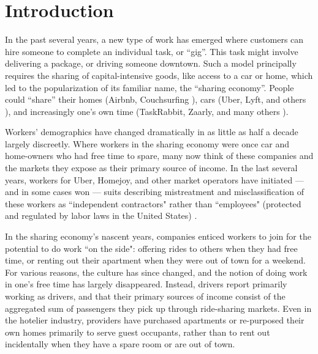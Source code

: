 \section{Introduction}



In the past several years, a new type of work has emerged where customers can hire someone to complete an individual task, or ``gig''.
This task might involve delivering a package, or driving someone downtown.
Such a model principally requires the sharing of capital-intensive goods, like access to a car or home,
which led to the popularization of its familiar name, the ``sharing economy''.
People could ``share'' their homes (Airbnb, Couchsurfing \cite{airbnbOfficial,couchsurfingOfficial}), cars (Uber, Lyft, and others \cite{uberOfficial,lyftOfficial}), and increasingly one's own time (TaskRabbit, Zaarly, and many others \cite{taskrabbitOfficial,zaarlyOfficial}).

Workers' demographics have changed dramatically in as little as half a decade largely discreetly.
Where workers in the sharing economy were once car and home-owners who had free time to spare,
many now think of these companies and the markets they expose as their primary source of income.
In the last several years, workers for Uber, Homejoy,
and other market operators have initiated
--- and in some cases won \cite{homejoySuit,uberSuit} ---
suits describing mistreatment and misclassification of these workers as
``independent contractors" rather than ``employees" (protected and regulated by labor laws in the United States) \cite{fedsUber}.

In the sharing economy's nascent years, companies enticed workers to join for the potential to do work ``on the side": offering rides to others when they had free time, or renting out their apartment when they were out of town for a weekend.
For various reasons, the culture has since changed, and the notion of doing work in one's free time has largely disappeared.
Instead, drivers report primarily working as drivers, and that their primary sources of income consist of the aggregated sum of passengers they pick up through ride-sharing markets.
Even in the hotelier industry, providers have purchased apartments or re-purposed their own homes primarily to serve guest occupants, rather than to rent out incidentally when they have a spare room or are out of town.


